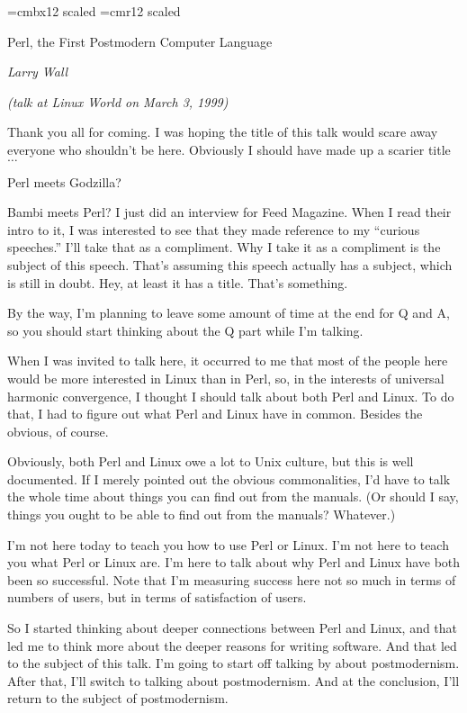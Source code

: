 \font\biggerbold=cmbx12 scaled %
\font\biggertxt=cmr12 scaled %
\def\title#1{\leavevmode\vskip 0.5in\centerline{\biggertxt #1}\par}%
\def\subtitle#1{\medskip\centerline{\sl #1}}%
\def\sect#1.{\bigbreak\noindent{\biggerbold #1}\par\noindent\ignorespaces}%
\def\startlist{\smallskip\begingroup\narrower\parskip=6pt}%

\title{Perl, the First Postmodern Computer Language}
\subtitle{Larry Wall}
\subtitle{(talk at {\rm Linux World} on March 3, 1999)}
\vskip 0.5in
\noindent Thank you all for coming. I was hoping the title of this talk would scare
away everyone who shouldn't be here. Obviously I should have made up a
scarier title $\ldots$
\medbreak
\item{}Perl meets Godzilla?
\item{}Bambi meets Perl?
\medbreak
\noindent I just did an interview for Feed Magazine. When I read their intro to it, I
was interested to see that they made reference to my ``curious speeches.''
I'll take that as a compliment. Why I take it as a compliment is the subject
of this speech. That's assuming this speech actually has a subject, which is
still in doubt. Hey, at least it has a title. That's something.

By the way, I'm planning to leave some amount of time at the end for Q and A,
so you should start thinking about the Q part while I'm talking.

When I was invited to talk here, it occurred to me that most of the people
here would be more interested in Linux than in Perl, so, in the interests of
universal harmonic convergence, I thought I should talk about both Perl and
Linux. To do that, I had to figure out what Perl and Linux have in common.
Besides the obvious, of course.

Obviously, both Perl and Linux owe a lot to Unix culture, but this is well
documented. If I merely pointed out the obvious commonalities, I'd have to
talk the whole time about things you can find out from the manuals. (Or
should I say, things you ought to be able to find out from the manuals?
Whatever.)

I'm not here today to teach you how to use Perl or Linux. I'm not here to
teach you what Perl or Linux are.
I'm here to talk about why Perl and Linux have both been so successful. Note
that I'm measuring success here not so much in terms of numbers of users, but
in terms of satisfaction of users.

So I started thinking about deeper connections between Perl and Linux, and
that led me to think more about the deeper reasons for writing software. And
that led to the subject of this talk. I'm going to start off talking by about
postmodernism. After that, I'll switch to talking about postmodernism. And at
the conclusion, I'll return to the subject of postmodernism.

